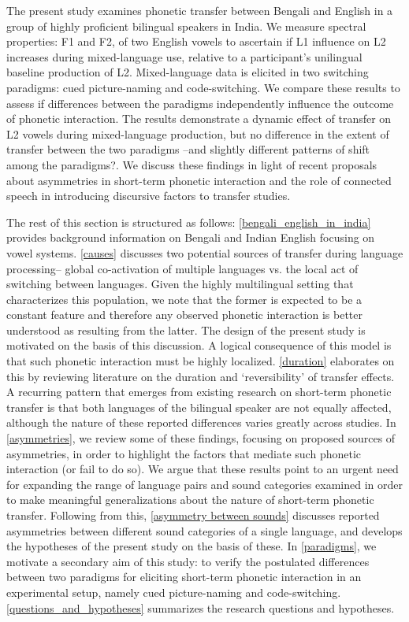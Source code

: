 \documentclass[12 pt]{article}
\begin{document}
The present study examines phonetic transfer between Bengali and English in a group of highly proficient bilingual speakers in India. We measure spectral properties: F1 and F2, of two English vowels to ascertain if L1 influence on L2 increases during mixed-language use, relative to a participant's unilingual baseline production of L2. Mixed-language data is elicited in two switching paradigms: cued picture-naming and code-switching. We compare these results to assess if differences between the paradigms independently influence the outcome of phonetic interaction. The results demonstrate a dynamic effect of transfer on L2 vowels during mixed-language production, \alert{but no difference in the extent of transfer between the two paradigms --and slightly different patterns of shift among the paradigms?}. We discuss these findings in light of recent proposals about asymmetries in short-term phonetic interaction and the role of connected speech in introducing discursive factors to transfer studies.


The rest of this section is structured as follows: \ref{bengali_english_in_india} provides background information on Bengali and Indian English focusing on vowel systems. \ref{causes} discusses two potential sources of transfer during language processing-- global co-activation of multiple languages vs. the local act of switching between languages. Given the highly multilingual setting that characterizes this population, we note that the former is expected to be a constant feature and therefore any observed phonetic interaction is better understood as resulting from the latter. The design of the present study is motivated on the basis of this discussion. A logical consequence of this model is that such phonetic interaction must be highly localized. \ref{duration} elaborates on this by reviewing literature on the duration and `reversibility' of transfer effects. A recurring pattern that emerges from existing research on short-term phonetic transfer is that both languages of the bilingual speaker are not equally affected, although the nature of these reported differences varies greatly across studies. In \ref{asymmetries}, we review some of these findings, focusing on proposed sources of asymmetries, in order to highlight the factors that mediate such phonetic interaction (or fail to do so). We argue that these results point to an urgent need for expanding the range of language pairs and sound categories examined in order to make meaningful generalizations about the nature of short-term phonetic transfer. Following from this, \ref{asymmetry between sounds} discusses reported asymmetries between different sound categories of a single language, and develops the hypotheses of the present study on the basis of these. In \ref{paradigms}, we motivate a secondary aim of this study: to verify the postulated differences between two paradigms for eliciting short-term phonetic interaction in an experimental setup, namely cued picture-naming and code-switching. \ref{questions_and_hypotheses} summarizes the research questions and hypotheses.
\end{document}
